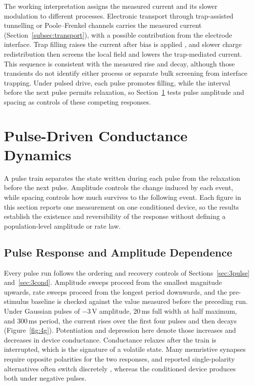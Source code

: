 \noindent The working interpretation assigns the measured current and its slower modulation to different processes.
Electronic transport through trap-assisted tunnelling or Poole--Frenkel channels carries the measured current
(Section~\ref{subsec:transport}), with a possible contribution from the electrode interface. Trap filling raises the
current after bias is applied \cite{el2013identification}, and slower charge redistribution then screens the local
field and lowers the trap-mediated current. This sequence is consistent with the measured rise and decay, although
those transients do not identify either process or separate bulk screening from interface trapping. Under pulsed
drive, each pulse promotes filling, while the interval before the next pulse permits relaxation, so
Section~\ref{sec:4p-pulse} tests pulse amplitude and spacing as controls of these competing responses.

\section[Pulse-Driven Conductance Dynamics]{Pulse-Driven Conductance Dynamics}\label{sec:4p-pulse}

\noindent A pulse train separates the state written during each pulse from the relaxation before the next pulse.
Amplitude controls the change induced by each event, while spacing controls how much survives to the following
event. Each figure in this section reports one measurement on one conditioned device, so the results establish the
existence and reversibility of the response without defining a population-level amplitude or rate law.

\subsection[Pulse Response and Amplitude Dependence]{Pulse Response and Amplitude Dependence}

\noindent Every pulse run follows the ordering and recovery controls of Sections~\ref{sec:3pulse}
and~\ref{sec:3cond}. Amplitude sweeps proceed from the smallest magnitude upwards, rate sweeps proceed from the
longest period downwards, and the pre-stimulus baseline is checked against the value measured before the preceding
run. Under Gaussian pulses of $-3$\,V amplitude, 20\,ms full width at half maximum, and 300\,ms period, the current
rises over the first four pulses and then decays (Figure~\ref{fig:4g}). Potentiation and depression here denote those
increases and decreases in device conductance. Conductance relaxes after the train is interrupted, which is the
signature of a volatile state. Many memristive synapses require opposite polarities for the two responses, and
reported single-polarity alternatives often switch discretely \cite{jo2010nanoscale, khan2020comparison, mehonic2012electrically}, whereas the conditioned device produces both under negative pulses.

